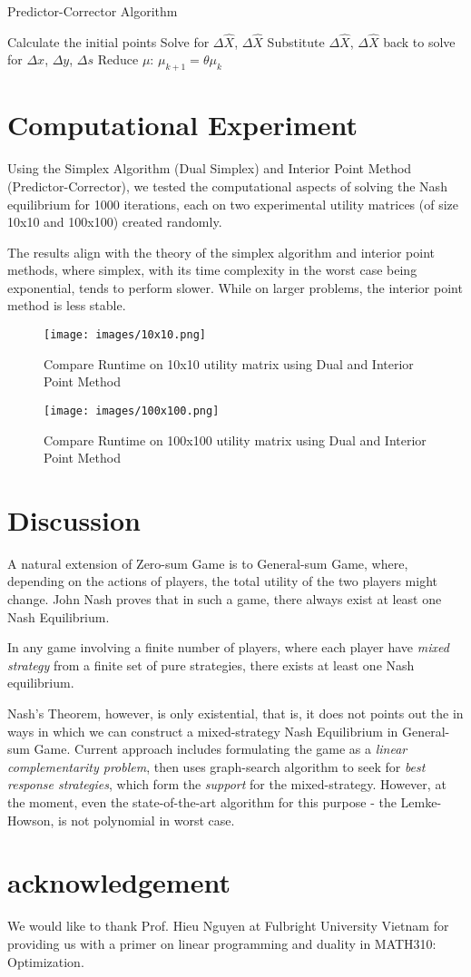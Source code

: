 \documentclass[11pt,reqno, a4]{amsart}
\begin{document}
\begin{algorithm}
    \caption{Predictor-Corrector Algorithm}
    \begin{algorithmic}
    \State Calculate the initial points
        \State Solve for $\Delta\hat{X}$, $\Delta\hat{X}$
        \State Substitute $\Delta\hat{X}$, $\Delta\hat{X}$ back to solve for $\Delta{x}$, $\Delta{y}$, $\Delta{s}$
        \State Reduce $\mu$: $\mu_{k+1} = \theta\mu_{k}$
    \EndFor
    \end{algorithmic}
\end{algorithm} 


\section{Computational Experiment}
Using the Simplex Algorithm (Dual Simplex) and Interior Point Method (Predictor-Corrector), we tested the computational aspects of solving the Nash equilibrium for 1000 iterations, each on two experimental utility matrices (of size 10x10 and 100x100) created randomly.

The results align with the theory of the simplex algorithm and interior point methods, where simplex, with its time complexity in the worst case being exponential, tends to perform slower. While on larger problems, the interior point method is less stable. 
\begin{figure}[!htb]
    \centering
    \texttt{[image: images/10x10.png]}
    \caption{Compare Runtime on 10x10 utility matrix using Dual and Interior Point Method}
    \label{fig:10x10}
\end{figure}
\begin{figure}[!htb]
    \centering
    \texttt{[image: images/100x100.png]}
    \caption{Compare Runtime on 100x100 utility matrix using Dual and Interior Point Method}
    \label{fig:100x100}
\end{figure}

\section{Discussion}
A natural extension of Zero-sum Game is to General-sum Game, where, depending on the actions of players, the total utility of the two players might change. John Nash proves that in such a game, there always exist at least one Nash Equilibrium. 
\begin{theorem}
    In any game involving a finite number of players, where each player have \textit{mixed strategy} from a finite set of pure strategies, there exists at least one Nash equilibrium.
\end{theorem}
Nash's Theorem, however, is only existential, that is, it does not points out the in ways in which we can construct a mixed-strategy Nash Equilibrium in General-sum Game. Current approach includes formulating the game as a \textit{linear complementarity problem}, then uses graph-search algorithm to seek for \textit{best response strategies}, which form the \textit{support} for the mixed-strategy. However, at the moment, even the state-of-the-art algorithm for this purpose - the Lemke-Howson, is not polynomial in worst case.
\section*{acknowledgement}
    We would like to thank Prof. Hieu Nguyen at Fulbright University Vietnam for providing us with a primer on linear programming and duality in MATH310: Optimization.
\end{document}

